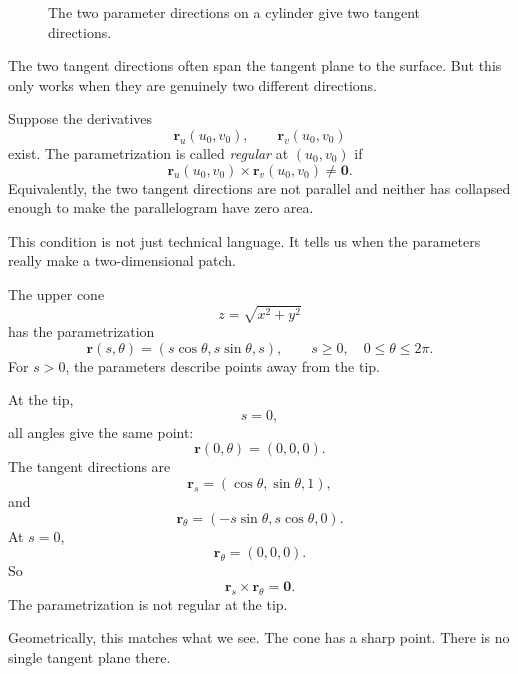 \begin{figure}[h]
\centering
{}
\caption{The two parameter directions on a cylinder give two tangent directions.}
\end{figure}

The two tangent directions often span the tangent plane to the surface.  But this only
works when they are genuinely two different directions.

\begin{definition}
Suppose the derivatives
\[
    \mathbf r_u(u_0,v_0),
    \qquad
    \mathbf r_v(u_0,v_0)
\]
exist.  The parametrization is called \emph{regular} at \((u_0,v_0)\) if
\[
    \mathbf r_u(u_0,v_0)\times \mathbf r_v(u_0,v_0)\neq \mathbf 0.
\]
Equivalently, the two tangent directions are not parallel and neither has collapsed
enough to make the parallelogram have zero area.
\end{definition}

This condition is not just technical language.  It tells us when the parameters really
make a two-dimensional patch.

\begin{example}
The upper cone
\[
    z=\sqrt{x^2+y^2}
\]
has the parametrization
\[
    \mathbf r(s,\theta)
    =
    (s\cos\theta,s\sin\theta,s),
    \qquad
    s\ge0,\quad 0\le\theta\le2\pi.
\]
For \(s>0\), the parameters describe points away from the tip.

At the tip,
\[
    s=0,
\]
all angles give the same point:
\[
    \mathbf r(0,\theta)=(0,0,0).
\]
The tangent directions are
\[
    \mathbf r_s=(\cos\theta,\sin\theta,1),
\]
and
\[
    \mathbf r_\theta=(-s\sin\theta,s\cos\theta,0).
\]
At \(s=0\),
\[
    \mathbf r_\theta=(0,0,0).
\]
So
\[
    \mathbf r_s\times\mathbf r_\theta=\mathbf 0.
\]
The parametrization is not regular at the tip.

Geometrically, this matches what we see.  The cone has a sharp point.  There is no
single tangent plane there.
\end{example}

